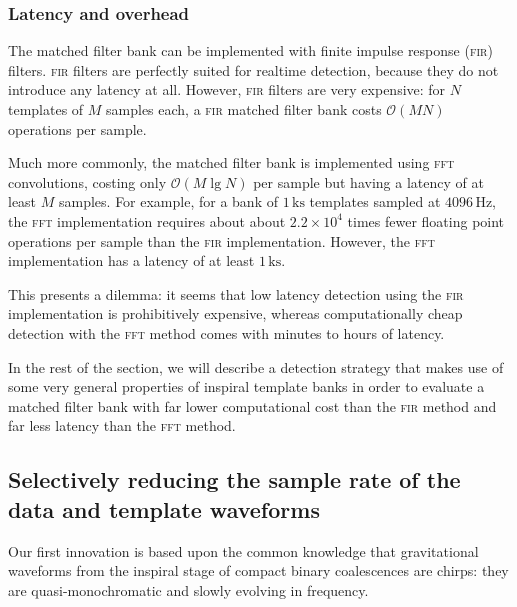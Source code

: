 \subsubsection{Latency and overhead}

The matched filter bank can be implemented with finite impulse response (\textsc{fir}) filters.  \textsc{fir} filters are perfectly suited for realtime detection, because they do not introduce any latency at all.  However, \textsc{fir} filters are very expensive: for $N$ templates of $M$ samples each, a \textsc{fir} matched filter bank costs $\mathcal O(M N)$ operations per sample.

Much more commonly, the matched filter bank is implemented using \textsc{fft} convolutions, costing only $\mathcal O(M \lg N)$  per sample but having a latency of at least $M$ samples.  For example, for a bank of $1\,\mathrm{ks}$ templates sampled at $4096\,\mathrm{Hz}$, the \textsc{fft} implementation requires about about $2.2 \times 10^4$ times fewer floating point operations per sample than the \textsc{fir} implementation.  However, the \textsc{fft} implementation has a latency of at least $1\,\mathrm{ks}$.

This presents a dilemma: it seems that low latency detection using the \textsc{fir} implementation is prohibitively expensive, whereas computationally cheap detection with the \textsc{fft} method comes with minutes to hours of latency.

In the rest of the section, we will describe a detection strategy that makes use of some very general properties of inspiral template banks in order to evaluate a matched filter bank with far lower computational cost than the \textsc{fir} method and far less latency than the \textsc{fft} method.

\subsection{Selectively reducing the sample rate of the data and template waveforms}

Our first innovation is based upon the common knowledge that gravitational waveforms from the inspiral stage of compact binary coalescences are chirps: they are quasi-monochromatic and slowly evolving in frequency.


